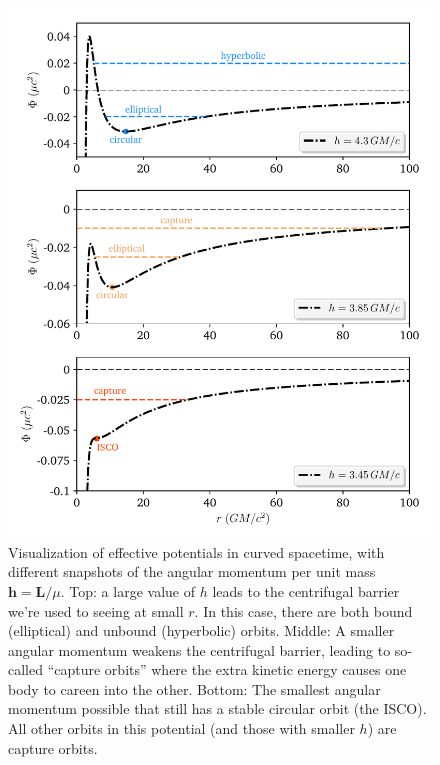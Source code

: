 \documentclass[11pt]{article}
\begin{document}
\begin{enumerate}
\begin{figure}[!th]
\centering
\includegraphics{relativistic_orbit/schwarzschild_potentials.pdf}
\caption{\label{fig:schwarzschild_potentials}Visualization of effective potentials in curved spacetime, with different snapshots of the angular momentum per unit mass $\mathbf{h} = \mathbf{L}/\mu$. Top: a large value of $h$ leads to the centrifugal barrier we're used to seeing at small $r$. In this case, there are both bound (elliptical) and unbound (hyperbolic) orbits. Middle: A smaller angular momentum weakens the centrifugal barrier, leading to so-called ``capture orbits'' where the extra kinetic energy causes one body to careen into the other. Bottom: The smallest angular momentum possible that still has a stable circular orbit (the ISCO). All other orbits in this potential (and those with smaller $h$) are capture orbits.}
\end{figure}


\end{enumerate}
\end{document}
